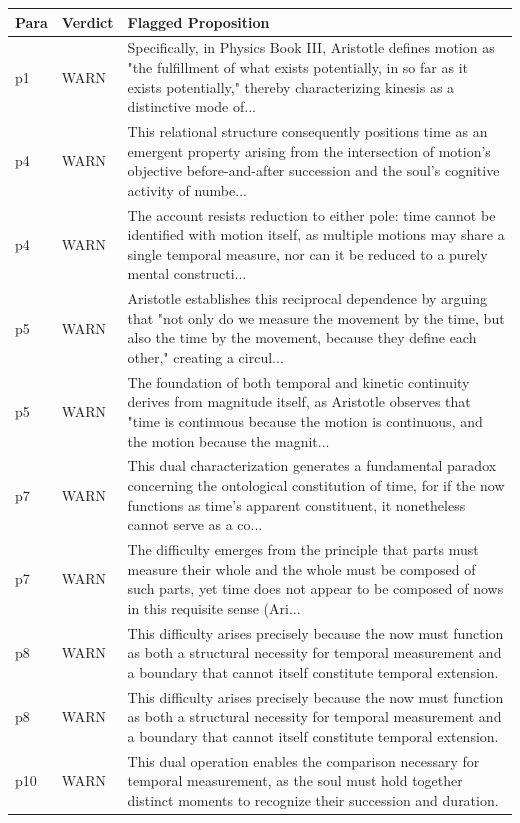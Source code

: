 \documentclass[12pt,a4paper]{article}
\begin{document}
\begin{longtable}{p{1cm}p{1.5cm}p{11cm}}
\toprule
\textbf{Para} & \textbf{Verdict} & \textbf{Flagged Proposition} \\
\midrule
p1 & WARN & Specifically, in Physics Book III, Aristotle defines motion as "the fulfillment of what exists potentially, in so far as it exists potentially," thereby characterizing kinesis as a distinctive mode of... \\
\midrule
p4 & WARN & This relational structure consequently positions time as an emergent property arising from the intersection of motion's objective before-and-after succession and the soul's cognitive activity of numbe... \\
\midrule
p4 & WARN & The account resists reduction to either pole: time cannot be identified with motion itself, as multiple motions may share a single temporal measure, nor can it be reduced to a purely mental constructi... \\
\midrule
p5 & WARN & Aristotle establishes this reciprocal dependence by arguing that "not only do we measure the movement by the time, but also the time by the movement, because they define each other," creating a circul... \\
\midrule
p5 & WARN & The foundation of both temporal and kinetic continuity derives from magnitude itself, as Aristotle observes that "time is continuous because the motion is continuous, and the motion because the magnit... \\
\midrule
p7 & WARN & This dual characterization generates a fundamental paradox concerning the ontological constitution of time, for if the now functions as time's apparent constituent, it nonetheless cannot serve as a co... \\
\midrule
p7 & WARN & The difficulty emerges from the principle that parts must measure their whole and the whole must be composed of such parts, yet time does not appear to be composed of nows in this requisite sense (Ari... \\
\midrule
p8 & WARN & This difficulty arises precisely because the now must function as both a structural necessity for temporal measurement and a boundary that cannot itself constitute temporal extension. \\
\midrule
p8 & WARN & This difficulty arises precisely because the now must function as both a structural necessity for temporal measurement and a boundary that cannot itself constitute temporal extension. \\
\midrule
p10 & WARN & This dual operation enables the comparison necessary for temporal measurement, as the soul must hold together distinct moments to recognize their succession and duration. \\
\midrule
\bottomrule
\end{longtable}
\end{document}
